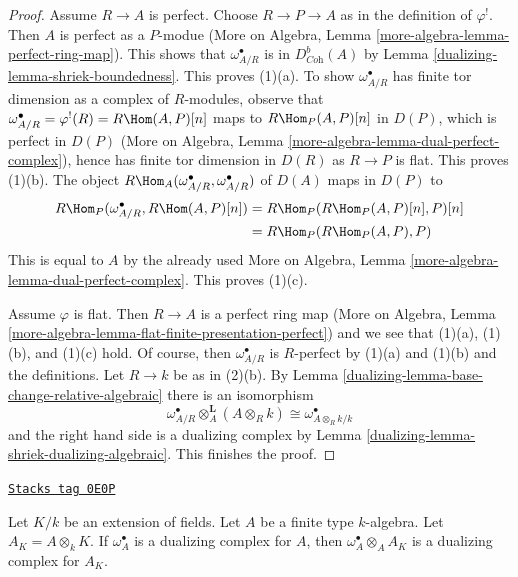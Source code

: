 \begin{proof}

Assume $R \to A$ is perfect. Choose $R \to P \to A$ as in the definition
of $\varphi^!$. Then $A$ is perfect as a $P$-modue
(More on Algebra, Lemma \ref{more-algebra-lemma-perfect-ring-map}).
This shows that $\omega_{A/R}^\bullet$ is in $D^b_{\textit{Coh}}(A)$
by Lemma \ref{dualizing-lemma-shriek-boundedness}. This proves (1)(a).
To show $\omega_{A/R}^\bullet$ has finite tor dimension
as a complex of $R$-modules, observe that
$\omega_{A/R}^\bullet = \varphi^!(R) = R\Hom(A, P)[n]$
maps to $R\Hom_P(A, P)[n]$ in $D(P)$, which is perfect in $D(P)$
(More on Algebra, Lemma \ref{more-algebra-lemma-dual-perfect-complex}),
hence has finite tor dimension in $D(R)$
as $R \to P$ is flat. This proves (1)(b). The object
$R\Hom_A(\omega_{A/R}^\bullet, \omega_{A/R}^\bullet)$
of $D(A)$ maps in $D(P)$ to
\begin{align*}
R\Hom_P(\omega_{A/R}^\bullet, R\Hom(A, P)[n])
& =
R\Hom_P(R\Hom_P(A, P)[n], P)[n] \\
& =
R\Hom_P(R\Hom_P(A, P), P)
\end{align*}
This is equal to $A$ by the already used
More on Algebra, Lemma \ref{more-algebra-lemma-dual-perfect-complex}.
This proves (1)(c).

\medskip\noindent
Assume $\varphi$ is flat. Then $R \to A$ is a perfect ring map
(More on Algebra, Lemma
\ref{more-algebra-lemma-flat-finite-presentation-perfect})
and we see that (1)(a), (1)(b), and (1)(c) hold.
Of course, then $\omega_{A/R}^\bullet$ is $R$-perfect by
(1)(a) and (1)(b) and the definitions.
Let $R \to k$ be as in (2)(b).
By Lemma \ref{dualizing-lemma-base-change-relative-algebraic}
there is an isomorphism
$$
\omega_{A/R}^\bullet \otimes_A^\mathbf{L} (A \otimes_R k) \cong
\omega^\bullet_{A \otimes_R k/k}
$$
and the right hand side is a dualizing complex by
Lemma \ref{dualizing-lemma-shriek-dualizing-algebraic}. This finishes the proof.
\end{proof}

\begin{lemma}
\label{dualizing-lemma-base-change-dualizing-over-field}
\href{https://stacks.math.columbia.edu/tag/0E0P}{\texttt{Stacks tag 0E0P}}

Let $K/k$ be an extension of fields. Let $A$ be a finite type
$k$-algebra. Let $A_K = A \otimes_k K$. If
$\omega_A^\bullet$ is a dualizing complex for $A$, then
$\omega_A^\bullet \otimes_A A_K$ is a dualizing complex for $A_K$.
\end{lemma}

